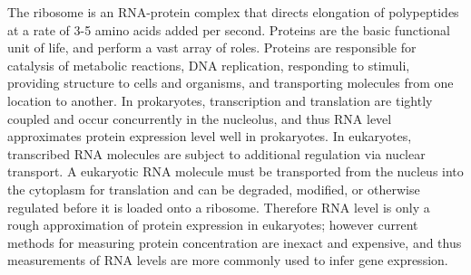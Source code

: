 \documentclass[paper=a4, fontsize=11pt]{scrartcl} %
\begin{document}
The ribosome is an RNA-protein complex that directs elongation of polypeptides at a rate of 3-5 amino acids added per second. Proteins are the basic functional unit of life, and perform a vast array of roles. Proteins are responsible for catalysis of metabolic reactions, DNA replication, responding to stimuli, providing structure to cells and organisms, and transporting molecules from one location to another. In prokaryotes, transcription and translation are tightly coupled and occur concurrently in the nucleolus, and thus RNA level approximates protein expression level well in prokaryotes. In eukaryotes, transcribed RNA molecules are subject to additional regulation via nuclear transport. A eukaryotic RNA molecule must be transported from the nucleus into the cytoplasm for translation and can be degraded, modified, or otherwise regulated before it is loaded onto a ribosome. Therefore RNA level is only a rough approximation of protein expression in eukaryotes; however current methods for measuring protein concentration are inexact and expensive, and thus measurements of RNA levels are more commonly used to infer gene expression.
\end{document}
